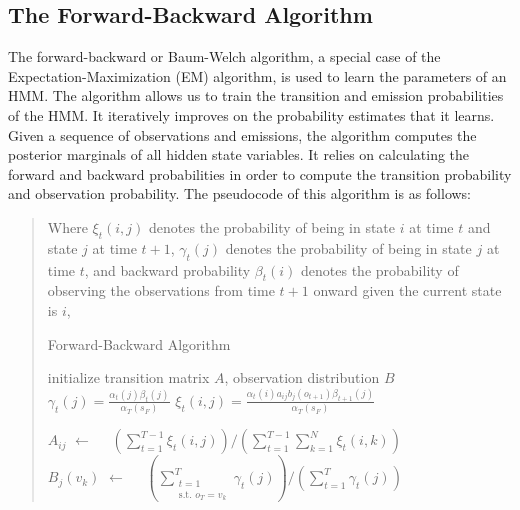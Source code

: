 \documentclass{article}
\begin{document}

\subsection{The Forward-Backward Algorithm}\label{sec:bw-alg}

The forward-backward or Baum-Welch algorithm, a special case of the Expectation-Maximization (EM) algorithm, is used to learn the parameters of an HMM. The algorithm allows us to train the transition and emission probabilities of the HMM. It iteratively improves on the probability estimates that it learns. Given a sequence of observations and emissions, the algorithm computes the posterior marginals of all hidden state variables. It relies on calculating the forward and backward probabilities in order to compute the transition probability and observation probability. The pseudocode of this algorithm is as follows:

\begin{quote}
Where $\xi_t(i, j)$ denotes the probability of being in state $i$ at time $t$ and state $j$ at time $t + 1$, $\gamma_t(j)$ denotes the probability of being in state $j$ at time $t$, and backward probability $\beta_t(i)$ denotes the probability of observing the observations from time $t + 1$ onward given the current state is $i$,
\begin{algorithm}
\caption{Forward-Backward Algorithm}
\begin{algorithmic}
    \State initialize transition matrix $A$, observation distribution $B$
    \Repeat
            $\displaystyle \gamma_t(j) = \frac{\alpha_t(j) \beta_t(j)} {\alpha_T(s_F)}$
        \EndFor
            $\displaystyle \xi_t(i, j) = \frac{\alpha_t(i) a_{ij} b_j(o_{t + 1}) \beta_{t + 1}(j)} {\alpha_T(s_F)}$
        \EndFor
        
        \State $A_{ij}$ $\gets$ 
        $\displaystyle \quad \left(\sum\limits_{t = 1}^{T - 1} \xi_t(i, j)\right)/
                            \left(\sum\limits_{t = 1}^{T - 1} \sum\limits_{k = 1}^{N} \xi_t(i, k)\right)$
        \\
        \State $B_{j}(v_k)$ $\gets$
        $\displaystyle \quad \left(\sum\limits_{\substack{t = 1 \\ \text{s.t. } o_T = v_k}}^{T} \gamma_t(j)\right) / \left(\sum\limits_{t = 1}^{T} \gamma_t(j)\right)$
        \\
    \EndProcedure
\end{algorithmic}
\end{algorithm}
\end{quote}
\end{document}
